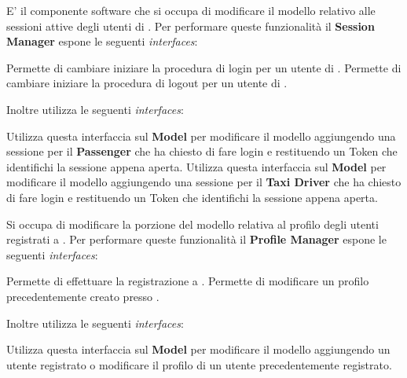 \begin{itemize}
\begin{itemize}
		 E' il componente software che si occupa di modificare il modello relativo alle sessioni attive degli utenti di \myTaxiService{}.
		Per performare queste funzionalità il \textbf{Session Manager} espone le seguenti \textit{interfaces}:
		\begin{itemize}
			 Permette di cambiare iniziare la procedura di login per un utente di \myTaxiService{}.
			 Permette di cambiare iniziare la procedura di logout per un utente di \myTaxiService{}.
		\end{itemize}
		Inoltre utilizza le seguenti \textit{interfaces}:
		\begin{itemize}
			 Utilizza questa interfaccia sul \textbf{Model} per modificare il modello aggiungendo una sessione per il \textbf{Passenger} che ha chiesto di fare login e restituendo un Token che identifichi la sessione appena aperta.
			 Utilizza questa interfaccia sul \textbf{Model} per modificare il modello aggiungendo una sessione per il \textbf{Taxi Driver} che ha chiesto di fare login e restituendo un Token che identifichi la sessione appena aperta.
		\end{itemize}
		
		 Si occupa di modificare la porzione del modello relativa al profilo degli utenti registrati a \myTaxiService{}.
		Per performare queste funzionalità il \textbf{Profile Manager} espone le seguenti \textit{interfaces}:
		\begin{itemize}
			 Permette di effettuare la registrazione a \myTaxiService{}.
			 Permette di modificare un profilo precedentemente creato presso \myTaxiService{}.
		\end{itemize}
		Inoltre utilizza le seguenti \textit{interfaces}:
		\begin{itemize}
			 Utilizza questa interfaccia sul \textbf{Model} per modificare il modello aggiungendo un utente registrato o modificare il profilo di un utente precedentemente registrato.
		\end{itemize}


\end{itemize}
\end{itemize}

